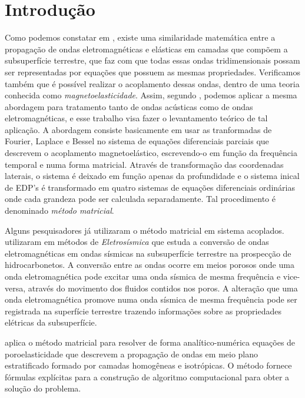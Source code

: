 \chapter{Introdu\c{c}\~ao}
Como podemos constatar em \cite{eringen_1963}, existe uma similaridade matem\'atica entre a propaga\c{c}\~ao de ondas eletromagn\'eticas e el\'asticas em camadas que comp\~oem a subsuperf\'icie terrestre, que faz com que todas essas ondas tridimensionais possam ser representadas por equa\c{c}\~oes que possuem as mesmas propriedades. Verificamos tamb\'em que \'e poss\'ivel realizar o acoplamento dessas ondas, dentro de uma teoria conhecida como \textit{magnetoelasticidade}. Assim, segundo \cite{Ursin-1983}, podemos aplicar a mesma abordagem para tratamento tanto de ondas ac\'usticas como de ondas eletromagn\'eticas, e esse trabalho visa fazer o levantamento te\'orico de tal aplica\c{c}\~ao. A abordagem consiste basicamente em usar as tranformadas de Fourier, Laplace e Bessel no sistema de equa\c{c}\~oes diferenciais parciais que descrevem o acoplamento magnetoel\'astico, escrevendo-o em fun\c{c}\~ao da frequ\^encia temporal e numa forma matricial. Atrav\'es de transforma\c{c}\~ao das coordenadas laterais, o sistema \'e deixado em fun\c{c}\~ao apenas da profundidade e o sistema inical de EDP's \'e transformado em quatro sistemas de equa\c{c}\~oes diferenciais ordin\'arias onde cada grandeza pode ser calculada separadamente. Tal procedimento \'e denominado \textit{m\'etodo matricial}.

Alguns pesquisadores j\'a utilizaram o m\'etodo matricial em sistema acoplados. \cite{White_Zhou_2006} utilizaram em m\'etodos de \textit{Eletros\'ismica} que estuda a convers\~ao de ondas eletromagn\'eticas em ondas s\'ismicas na subsuperf\'icie terrestre na prospec\c{c}\~ao de hidrocarbonetos. A convers\~ao entre as ondas ocorre em meios porosos onde uma onda eletromagn\'etica pode excitar uma onda s\'ismica de mesma frequ\^encia e vice-versa, atrav\'es do movimento dos fluidos contidos nos poros. A altera\c{c}\~ao que uma onda eletromagn\'etica promove numa onda s\'ismica de mesma frequ\^encia pode ser registrada na superf\'icie terrestre trazendo informa\c{c}\~oes sobre as propriedades el\'etricas da subsuperf\'icie. 

\cite{Azeredo_2013} aplica o m\'etodo matricial para resolver de forma anal\'itico-num\'erica equa\c{c}\~oes de poroelasticidade que descrevem a propaga\c{c}\~ao de ondas em meio plano estratificado formado por camadas homog\^eneas e isotr\'opicas. O m\'etodo fornece f\'ormulas expl\'icitas para a constru\c{c}\~ao de algoritmo computacional  para obter a solu\c{c}\~ao do problema.